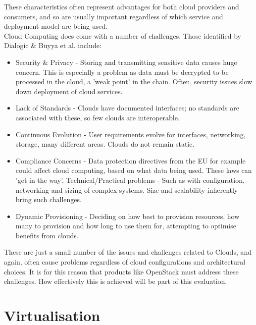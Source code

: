 These characteristics often represent advantages for both cloud providers and consumers, and so are usually important regardless of which service and deployment model are being used. \\ 

Cloud Computing does come with a number of challenges. Those identified by Dialogic \& Buyya et al. include:

\begin{itemize}
\itemsep0em
\item Security \& Privacy - Storing and transmitting sensitive data causes huge concern. This is especially a problem as data must be decrypted to be processed in the cloud, a 'weak point' in the chain. Often, security issues slow down deployment of cloud services. 
\item Lack of Standards - Clouds have documented interfaces; no standards are associated with these, so few clouds are interoperable. 
\item Continuous Evolution - User requirements evolve for interfaces, networking, storage, many different areas. Clouds do not remain static. 
\item Compliance Concerns - Data protection directives from the EU for example could affect cloud computing, based on what data being used. These laws can 'get in the way'. 
Technical/Practical problems - Such as with configuration, networking and sizing of complex systems. Size and scalability inherently bring such challenges. 
\item Dynamic Provisioning - Deciding on how best to provision resources, how many to provision and how long to use them for, attempting to optimise benefits from clouds.  
\end{itemize}

These are just a small number of the issues and challenges related to Clouds, and again, often cause problems regardless of cloud configurations and architectural choices. It is for this reason that products like OpenStack must address these challenges. How effectively this is achieved will be part of this evaluation.


\section{Virtualisation}
